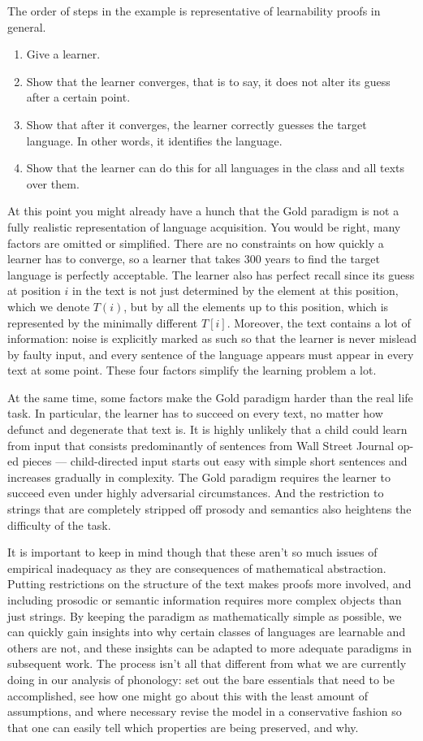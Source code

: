 %
The order of steps in the example is representative of learnability proofs in general.
%
\begin{enumerate}
    \item Give a learner.
    \item Show that the learner converges, that is to say, it does not alter its guess after a certain point.
    \item Show that after it converges, the learner correctly guesses the target language.
        In other words, it identifies the language.
    \item Show that the learner can do this for all languages in the class and all texts over them. 
\end{enumerate}

At this point you might already have a hunch that the Gold paradigm is not a fully realistic representation of language acquisition.
You would be right, many factors are omitted or simplified.
There are no constraints on how quickly a learner has to converge, so a learner that takes 300 years to find the target language is perfectly acceptable.
The learner also has perfect recall since its guess at position $i$ in the text is not just determined by the element at this position, which we denote $T(i)$, but by all the elements up to this position, which is represented by the minimally different $T[i]$.
Moreover, the text contains a lot of information: noise is explicitly marked as such so that the learner is never mislead by faulty input, and every sentence of the language appears must appear in every text at some point.
These four factors simplify the learning problem a lot.

At the same time, some factors make the Gold paradigm harder than the real life task.
In particular, the learner has to succeed on every text, no matter how defunct and degenerate that text is.
It is highly unlikely that a child could learn from input that consists predominantly of sentences from Wall Street Journal op-ed pieces --- child-directed input starts out easy with simple short sentences and increases gradually in complexity.
The Gold paradigm requires the learner to succeed even under highly adversarial circumstances.
And the restriction to strings that are completely stripped off prosody and semantics also heightens the difficulty of the task.

It is important to keep in mind though that these aren't so much issues of empirical inadequacy as they are consequences of mathematical abstraction.
Putting restrictions on the structure of the text makes proofs more involved, and including prosodic or semantic information requires more complex objects than just strings.
By keeping the paradigm as mathematically simple as possible, we can quickly gain insights into why certain classes of languages are learnable and others are not, and these insights can be adapted to more adequate paradigms in subsequent work.
The process isn't all that different from what we are currently doing in our analysis of phonology: set out the bare essentials that need to be accomplished, see how one might go about this with the least amount of assumptions, and where necessary revise the model in a conservative fashion so that one can easily tell which properties are being preserved, and why.



